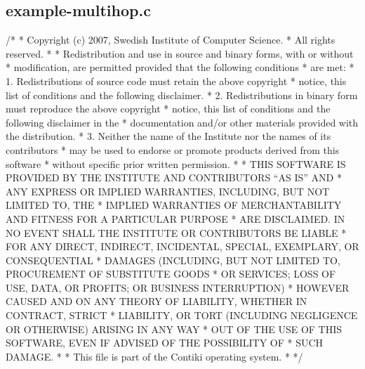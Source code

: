 \hypertarget{a00011}{\subsection{example-\/multihop.\-c}
}

\begin{DoxyCodeInclude}
/*
 * Copyright (c) 2007, Swedish Institute of Computer Science.
 * All rights reserved.
 *
 * Redistribution and use in source and binary forms, with or without
 * modification, are permitted provided that the following conditions
 * are met:
 * 1. Redistributions of source code must retain the above copyright
 *    notice, this list of conditions and the following disclaimer.
 * 2. Redistributions in binary form must reproduce the above copyright
 *    notice, this list of conditions and the following disclaimer in the
 *    documentation and/or other materials provided with the distribution.
 * 3. Neither the name of the Institute nor the names of its contributors
 *    may be used to endorse or promote products derived from this software
 *    without specific prior written permission.
 *
 * THIS SOFTWARE IS PROVIDED BY THE INSTITUTE AND CONTRIBUTORS ``AS IS'' AND
 * ANY EXPRESS OR IMPLIED WARRANTIES, INCLUDING, BUT NOT LIMITED TO, THE
 * IMPLIED WARRANTIES OF MERCHANTABILITY AND FITNESS FOR A PARTICULAR PURPOSE
 * ARE DISCLAIMED.  IN NO EVENT SHALL THE INSTITUTE OR CONTRIBUTORS BE LIABLE
 * FOR ANY DIRECT, INDIRECT, INCIDENTAL, SPECIAL, EXEMPLARY, OR CONSEQUENTIAL
 * DAMAGES (INCLUDING, BUT NOT LIMITED TO, PROCUREMENT OF SUBSTITUTE GOODS
 * OR SERVICES; LOSS OF USE, DATA, OR PROFITS; OR BUSINESS INTERRUPTION)
 * HOWEVER CAUSED AND ON ANY THEORY OF LIABILITY, WHETHER IN CONTRACT, STRICT
 * LIABILITY, OR TORT (INCLUDING NEGLIGENCE OR OTHERWISE) ARISING IN ANY WAY
 * OUT OF THE USE OF THIS SOFTWARE, EVEN IF ADVISED OF THE POSSIBILITY OF
 * SUCH DAMAGE.
 *
 * This file is part of the Contiki operating system.
 *
 */


\end{DoxyCodeInclude}
